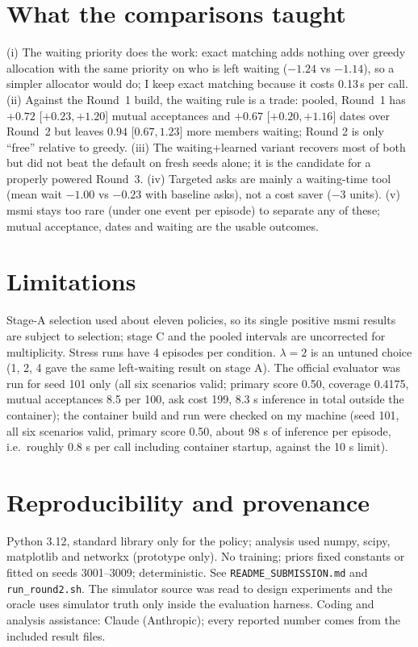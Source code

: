 \documentclass[10pt,a4paper]{article}
\begin{document}
\section{What the comparisons taught}
(i) The waiting priority does the work: exact matching adds nothing over greedy allocation with the same priority on who is left waiting ($-1.24$ vs $-1.14$), so a simpler allocator would do; I keep exact matching because it costs 0.13\,s per call. (ii) Against the Round~1 build, the waiting rule is a trade: pooled, Round~1 has $+0.72$ [$+0.23,+1.20$] mutual acceptances and $+0.67$ [$+0.20,+1.16$] dates over Round~2 but leaves $0.94$ [$0.67,1.23$] more members waiting; Round 2 is only ``free'' relative to greedy. (iii) The waiting+learned variant recovers most of both but did not beat the default on fresh seeds alone; it is the candidate for a properly powered Round~3. (iv) Targeted asks are mainly a waiting-time tool (mean wait $-1.00$ vs $-0.23$ with baseline asks), not a cost saver ($-3$ units). (v) msmi stays too rare (under one event per episode) to separate any of these; mutual acceptance, dates and waiting are the usable outcomes.

\section{Limitations}
Stage-A selection used about eleven policies, so its single positive msmi results are subject to selection; stage C and the pooled intervals are uncorrected for multiplicity. Stress runs have 4 episodes per condition. $\lambda=2$ is an untuned choice (1, 2, 4 gave the same left-waiting result on stage A). The official evaluator was run for seed 101 only (all six scenarios valid; primary score 0.50, coverage 0.4175, mutual acceptances 8.5 per 100, ask cost 199, 8.3 s inference in total outside the container); the container build and run were checked on my machine (seed 101, all six scenarios valid, primary score 0.50, about 98 s of inference per episode, i.e.\ roughly 0.8 s per call including container startup, against the 10 s limit).

\section{Reproducibility and provenance}
Python 3.12, standard library only for the policy; analysis used numpy, scipy, matplotlib and networkx (prototype only). No training; priors fixed constants or fitted on seeds 3001--3009; deterministic. See \texttt{README\_SUBMISSION.md} and \texttt{run\_round2.sh}. The simulator source was read to design experiments and the oracle uses simulator truth only inside the evaluation harness. Coding and analysis assistance: Claude (Anthropic); every reported number comes from the included result files.
\end{document}

